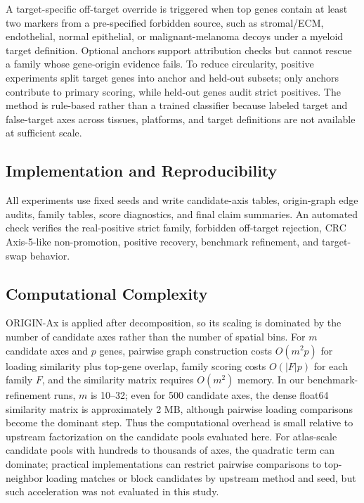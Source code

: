 \documentclass[conference]{IEEEtran}
\begin{document}
A target-specific off-target override is triggered when top genes contain at
least two markers from a pre-specified forbidden source, such as stromal/ECM,
endothelial, normal epithelial, or malignant-melanoma decoys under a myeloid
target definition. Optional anchors support attribution checks but cannot rescue
a family whose gene-origin evidence fails. To reduce circularity, positive
experiments split target genes into anchor and held-out subsets; only anchors
contribute to primary scoring, while held-out genes audit strict positives. The
method is rule-based rather than a trained classifier because labeled target and
false-target axes across tissues, platforms, and target definitions are not
available at sufficient scale.

\subsection{Implementation and Reproducibility}

All experiments use fixed seeds and write candidate-axis tables, origin-graph
edge audits, family tables, score diagnostics, and final claim summaries. An
automated check verifies the real-positive strict family, forbidden off-target
rejection, CRC Axis-5-like non-promotion, positive recovery, benchmark
refinement, and target-swap behavior.

\subsection{Computational Complexity}

ORIGIN-Ax is applied after decomposition, so its scaling is dominated by the
number of candidate axes rather than the number of spatial bins. For $m$
candidate axes and $p$ genes, pairwise graph construction costs $O(m^2p)$ for
loading similarity plus top-gene overlap, family scoring costs $O(|F|p)$ for
each family $F$, and the similarity matrix requires $O(m^2)$ memory. In our
benchmark-refinement runs, $m$ is 10--32; even for 500 candidate axes, the dense
float64 similarity matrix is approximately 2 MB, although pairwise loading
comparisons become the dominant step. Thus the computational overhead is small
relative to upstream factorization on the candidate pools evaluated here. For
atlas-scale candidate pools with hundreds to thousands of axes, the quadratic
term can dominate; practical implementations can restrict pairwise comparisons
to top-neighbor loading matches or block candidates by upstream method and seed,
but such acceleration was not evaluated in this study.
\end{document}
